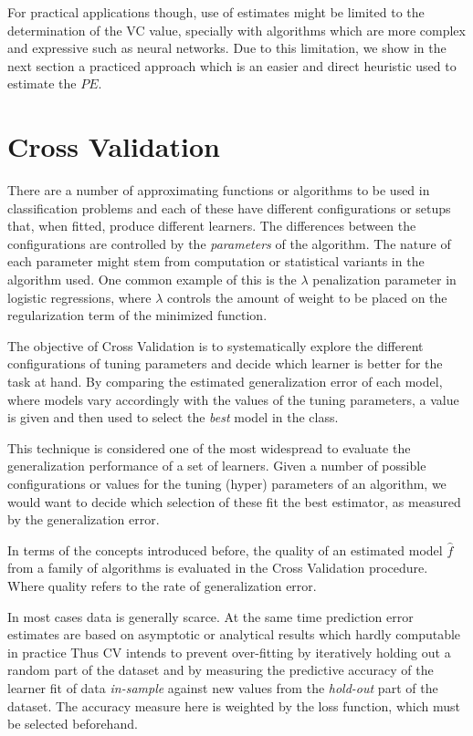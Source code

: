 For practical applications though, use of estimates might be limited to the determination of the VC value, specially with algorithms which are more complex and expressive such as neural networks.
Due to this limitation, we show in the next section a practiced approach which is an easier and direct heuristic used to estimate the $PE$.



\section{Cross Validation}\label{section:crossValidation}

 There are a number of approximating functions or algorithms to be used in classification problems and each of these have different configurations or setups that, when fitted, produce different learners.
The differences between the configurations are controlled by the \textit{parameters} of the algorithm.
The nature of each parameter might stem from computation or statistical variants in the algorithm used.
One common example of this is the $\lambda$ penalization parameter in logistic regressions, where $\lambda$ controls the amount of weight to be placed on the regularization term of the minimized function.

The objective of Cross Validation is to systematically explore the different configurations of tuning parameters and decide which learner is better for the task at hand.
By comparing the estimated generalization error of each model, where models vary accordingly with the values of the tuning parameters, a value is given and then used to select the \textit{best} model in the class.

This technique is considered one of the most widespread to evaluate the generalization performance of a set of learners.
Given a number of possible configurations or values for the tuning (hyper) parameters of an algorithm, we would want to decide which selection of these fit the best estimator, as measured by the generalization error.

In terms of the concepts introduced before, the quality of an estimated model $\hat{f}$ from a family of algorithms is evaluated in the Cross Validation procedure.
Where quality refers to the rate of generalization error.

In most cases data is generally scarce.
At the same time prediction error estimates are based on asymptotic or analytical results which hardly computable in practice Thus CV intends to prevent over-fitting by iteratively holding out a random part of the dataset and by measuring the predictive accuracy of the learner fit of data \textit{in-sample} against new values from the \textit{hold-out} part of the dataset.
The accuracy measure here is weighted by the loss function, which must be selected beforehand.

